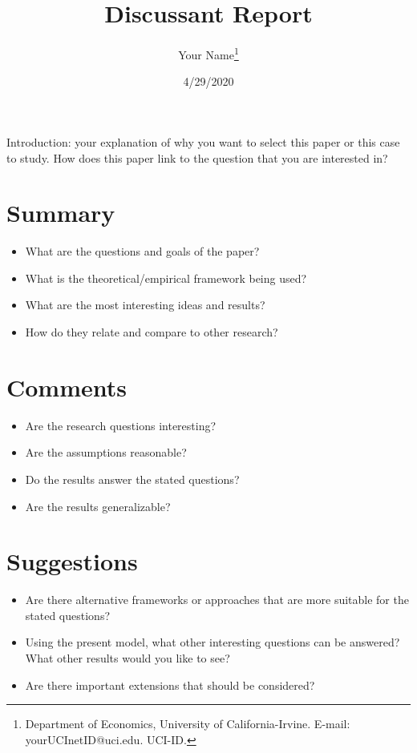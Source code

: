 \documentclass[12pt, letterpaper, oneside]{article}
\title{Discussant Report}
\author{Your Name\footnote{Department of Economics, University of California-Irvine. E-mail: yourUCInetID@uci.edu. UCI-ID.}}
\date{4/29/2020}
\begin{document}
\doublespacing

\maketitle

Introduction: your explanation of why you want to select this paper or this case to study. How does this paper link to the question that you are interested in?

\section{Summary}

\begin{itemize}
    \item What are the questions and goals of the paper?
    \item What is the theoretical/empirical framework being used?
    \item What are the most interesting ideas and results?
    \item How do they relate and compare to other research?
\end{itemize}

\section{Comments}

\begin{itemize}
    \item Are the research questions interesting?
    \item Are the assumptions reasonable?
    \item Do the results answer the stated questions?
    \item Are the results generalizable?
\end{itemize}

\section{Suggestions}

\begin{itemize}
    \item Are there alternative frameworks or approaches that are more suitable for the stated
    questions?
    \item Using the present model, what other interesting questions can be answered? What other
    results would you like to see?
    \item Are there important extensions that should be considered?
\end{itemize}
\end{document}
